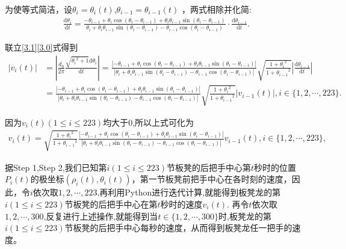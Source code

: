 \documentclass[../main.tex]{subfiles}
\begin{document}
  \par 为使等式简洁，设\(\theta _i = \theta _i(t)\),\(\theta _{i - 1} = \theta _{i - 1}(t)\) ，两式相除并化简:
      \begin{align}
  \frac{\mathrm{d}\theta _i}{\mathrm{d}t}=\frac{-\theta _{i - 1}+\theta _i\cos(\theta _{i }-\theta _{i-1})+\theta _i\theta _{i - 1}\sin(\theta _{i }-\theta _{i-1})}{\theta _i+\theta _i\theta _{i - 1}\sin(\theta _i -\theta _{i-1})-\theta _{i - 1}\cos(\theta _i -\theta _{i-1})}\cdot \frac{\mathrm{d}\theta _{i - 1}}{\mathrm{d}t}.\label{3.0}
  \end{align}
  \par 联立\eqref{3.1}\eqref{3.0}式得到
  \begin{align}
  |v_i(t)| &= \left|\frac{d_0}{2\pi}\frac{\sqrt{{\theta _i}^2 + 1}\mathrm{d}\theta _i}{\mathrm{d}t}\right| 
  = \frac{|-\theta _{i - 1}+\theta _i\cos(\theta _{i }-\theta _{i-1})+\theta _i\theta _{i - 1}\sin(\theta _{i }-\theta _{i-1})|}{|\theta _i+\theta _i\theta _{i - 1}\sin(\theta _i -\theta _{i-1})-\theta _{i - 1}\cos(\theta _i -\theta _{i-1})|}\sqrt{\frac{1 + {\theta _i}^2}{1 + {\theta _{i - 1}}^2}}\left|\frac{\mathrm{d}\theta _{i - 1}}{\mathrm{d}t}\right| \label{1.........15}\\
  &= \frac{|-\theta _{i - 1}+\theta _i\cos(\theta _{i }-\theta _{i-1})+\theta _i\theta _{i - 1}\sin(\theta _{i }-\theta _{i-1})|}{|\theta _i+\theta _i\theta _{i - 1}\sin(\theta _i -\theta _{i-1})-\theta _{i - 1}\cos(\theta _i -\theta _{i-1})|}\sqrt{\frac{1 + {\theta _i}^2}{1 + {\theta _{i - 1}}^2}}|v_{i - 1}(t)|, i\in \{1, 2, \cdots, 223\}.\label{1.........16}
  \end{align}
  \par 因为\(v_i(t) (1\leqslant i\leqslant 223)\)均大于\(0\),所以上式可化为
  \begin{align}\label{1.........17}
  v_i(t) = \sqrt{\frac{1 + {\theta _i}^2}{1 + {\theta _{i - 1}}^2}}\frac{|-\theta _{i - 1}+\theta _i\cos(\theta _{i }-\theta _{i-1})+\theta _i\theta _{i - 1}\sin(\theta _{i }-\theta _{i-1})|}{|\theta _i+\theta _i\theta _{i - 1}\sin(\theta _i -\theta _{i-1})-\theta _{i - 1}\cos(\theta _i -\theta _{i-1})|}v_{i - 1}(t), i\in \{1, 2, \cdots, 223\},
  \end{align}
  \par 据Step 1,Step 2,我们已知第\(i(1\leqslant i\leqslant 223)\)节板凳的后把手中心第\(t\)秒时的位置\(P_{i}(t)\)的极坐标\((\rho _{i}(t),\theta _{i}(t))\)，第一节板凳前把手中心在各时刻的速度，因此，令\(i\)依次取\(1, 2, \cdots, 223\),再利用Python进行迭代计算,就能得到板凳龙的第\(i(1\leqslant i\leqslant 223)\)节板凳的后把手中心在第\(t\)秒时的速度\(v_i(t)\).
  再令\(t\)依次取\(1, 2, \cdots, 300\),反复进行上述操作,就能得到当\(t\in \{1, 2, \cdots, 300\}\)时,板凳龙的第\(i(1\leqslant i\leqslant 223)\)节板凳的后把手中心每秒的速度，从而得到板凳龙任一把手的速度。
  
  
\end{document}
